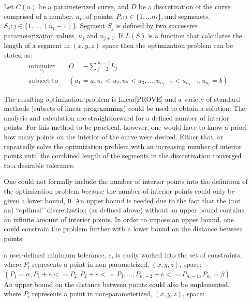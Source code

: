 \documentclass[preprint,12pt]{elsarticle}
\begin{document}
Let $C(u)$ be a parameterized curve, and $D$ be a discretization of the curve comprised of a number, $n_t$, of points, $P_i : i \in \{1,...n_t\}$, and segmenets, $S_j : j \in \{1,...,(n_t-1)\}$. Segment $S_j$ is defined by two successive parameterization values, $u_j$ and $u_{j+1}$. If $L(S)$ is a function that calculates the length of a segment  in $(x,y,z)$ space then the optimization problem can be stated as:
\begin{equation}
\begin{aligned}
& \underset{u_i}{\text{minimize}}
&& O=-\sum{_{j=2}^{n_t-1}L_j} \\
& \text{subject to}
&& (u_1 = a, u_1<u_2, u_2<u_3,..., u_{n_t-2}< u_{n_t-1}, u_{n_t} = b)
\end{aligned}
\end{equation}

\noindent The resulting optimization problem is linear[PROVE] and a variety of standard methods (subsets of linear programming) could be used to obtain a solution.  The analysis and calculation are straightforward for a defined number of interior points.  For this method to be practical, however, one would have to know a priori how many points on the interior of the curve were desired.  Either that, or repeatedly solve the optimization problem with an increasing number of interior points until the combined length of the segments in the discretization converged to a desirable tolerance.

One could not formally include the number of interior points into the definition of the optimization problem because the number of interior points could only be given a lower bound, 0.  An upper bound is needed due to the fact that the (not an) ``optimal'' discretization (as defined above) without an upper bound contains an infinite amount of interior points.  In order to impose an upper bound, one could constrain the problem further with a lower bound on the distance between points:

a user-defined minimum tolerance, $e$, is easily worked into the set of constraints, where $P_i$ represents a point in non-parametrized, $(x,y,z)$, space: \\
$(P_1 = \alpha, P_1+e <= P_2, P_2+e <= P_3, … , P_{n_t-2}+ e <= P_{n_t-1}, P_{n_t} = \beta)$ \\

\noindent An upper bound on the distance between points could also be implemented, where $P_i$ represents a point in non-parameterized, $(x,y,z)$, space:
\end{document}
